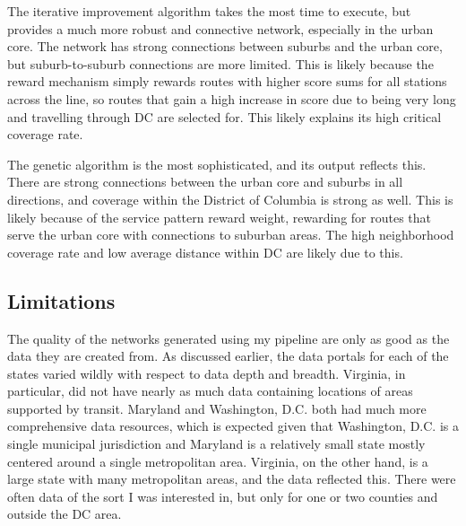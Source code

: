 \documentclass[sigconf,nonacm]{acmart}
\begin{document}
The iterative improvement algorithm takes the most time to execute, but provides a much more robust and connective network, especially in the urban core. The network has strong connections between suburbs and the urban core, but suburb-to-suburb connections are more limited. This is likely because the reward mechanism simply rewards routes with higher score sums for all stations across the line, so routes that gain a high increase in score due to being very long and travelling through DC are selected for. This likely explains its high critical coverage rate.

The genetic algorithm is the most sophisticated, and its output reflects this. There are strong connections between the urban core and suburbs in all directions, and coverage within the District of Columbia is strong as well. This is likely because of the service pattern reward weight, rewarding for routes that serve the urban core with connections to suburban areas. The high neighborhood coverage rate and low average distance within DC are likely due to this.

\subsection{Limitations}
The quality of the networks generated using my pipeline are only as good as the data they are created from. As discussed earlier, the data portals for each of the states varied wildly with respect to data depth and breadth. Virginia, in particular, did not have nearly as much data containing locations of areas supported by transit. Maryland and Washington, D.C. both had much more comprehensive data resources, which is expected given that Washington, D.C. is a single municipal jurisdiction and Maryland is a relatively small state mostly centered around a single metropolitan area. Virginia, on the other hand, is a large state with many metropolitan areas, and the data reflected this. There were often data of the sort I was interested in, but only for one or two counties and outside the DC area. 
\end{document}
